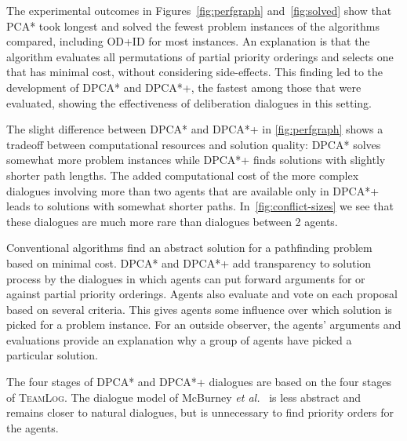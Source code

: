 
The experimental outcomes in Figures~\ref{fig:perfgraph} and~\ref{fig:solved} 
show that PCA* took longest and solved the fewest problem instances of the 
algorithms compared, including OD+ID for most instances. An explanation is that 
the algorithm 
evaluates all permutations of partial priority orderings and selects one that has
minimal cost, without considering side-effects. This finding led to the 
development of DPCA* and DPCA*+, the fastest among those that were evaluated, 
showing the effectiveness of deliberation 
dialogues in this setting.

The slight difference between DPCA* and DPCA*+ in \autoref{fig:perfgraph} shows a tradeoff between computational resources and solution quality: DPCA* solves somewhat more problem 
instances while DPCA*+ finds solutions with slightly shorter path lengths.
The added computational cost of the more complex dialogues involving more than two agents that are available only in DPCA*+ leads to solutions with somewhat shorter paths. In~\autoref{fig:conflict-sizes} we see that these dialogues are much more rare than dialogues between 2 agents. 

Conventional algorithms find an abstract solution for a pathfinding problem based on minimal cost. DPCA* and DPCA*+ add transparency to solution process by the dialogues in which agents can put forward arguments for or against 
partial 
priority orderings. Agents also evaluate and vote on each proposal based on several 
criteria. This gives agents some influence over which solution 
is picked for a problem instance. For an outside observer, the agents' arguments and evaluations provide an explanation why a group of agents have picked a particular 
solution. 

The four stages of DPCA* and DPCA*+ dialogues are based on the 
four stages of \textsc{TeamLog}. The dialogue model of 
McBurney \emph{et al.}~\cite{mcburney2007} is less abstract and remains closer 
to natural dialogues, but is unnecessary to find 
priority orders for the agents. 

